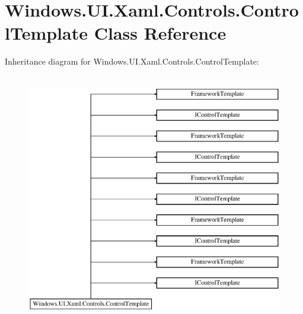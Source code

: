 \hypertarget{class_windows_1_1_u_i_1_1_xaml_1_1_controls_1_1_control_template}{}\section{Windows.\+U\+I.\+Xaml.\+Controls.\+Control\+Template Class Reference}
\label{class_windows_1_1_u_i_1_1_xaml_1_1_controls_1_1_control_template}
Inheritance diagram for Windows.\+U\+I.\+Xaml.\+Controls.\+Control\+Template\+:\begin{figure}[H]
\begin{center}
\leavevmode
\includegraphics[height=11.000000cm]{class_windows_1_1_u_i_1_1_xaml_1_1_controls_1_1_control_template}
\end{center}
\end{figure}
